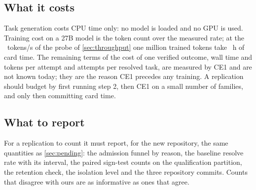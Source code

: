\subsection{What it costs}

Task generation costs CPU time only: no model is loaded and no GPU is used. Training
cost on a 27B model is the token count over the measured rate; at the \mThrNfFourEightOneNineTwoTokensPerS{}~tokens/s of the
probe of \cref{sec:throughput} one million trained tokens take \mThrHoursPerMillionTokens{}~h
of card time. The remaining terms of the cost of one verified outcome, wall time and
tokens per attempt and attempts per resolved task, are measured by CE1 and are not known
today; they are the reason CE1 precedes any training. A replication should budget by first
running step 2, then CE1 on a small number of families, and only then committing card time.

\subsection{What to report}

For a replication to count it must report, for the new repository, the same quantities as
\cref{sec:pending}: the admission funnel by reason, the baseline resolve rate with its
interval, the paired sign-test counts on the qualification partition, the retention check,
the isolation level and the three repository commits. Counts that disagree with ours are as
informative as ones that agree.
